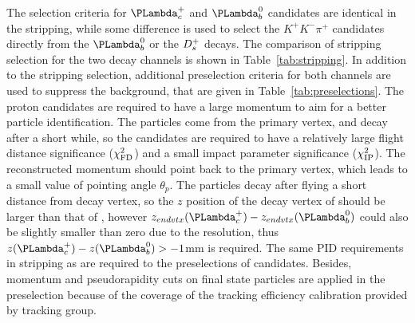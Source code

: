 The selection criteria for $\Lc$ and $\Lb$ candidates are identical in the stripping, 
while some difference is used to select the $K^+K^-\pi^+$ candidates  directly from the $\Lb$ or the ${{D}^+_{s}}$ decays. 
The comparison of stripping selection for the two decay channels is shown in Table~\ref{tab:stripping}. 
In addition to the stripping selection, additional preselection criteria for both channels are used to suppress the background, 
that are given in Table~\ref{tab:preselections}. 
The proton candidates are required to have a large momentum to aim for a better particle identification. 
The \Lb particles come from the primary vertex, 
and decay after a short while, 
so the \Lb candidates are required to have a relatively large flight distance significance ($\chi^2_{\rm FD}$)  
and a small impact parameter significance ($\chi^2_{\rm IP}$). 
The reconstructed \Lb momentum should point back to the primary vertex, 
which leads to a small value of pointing angle $\theta_p$. 
The \Lc particles decay after flying a short distance from \Lb decay vertex, 
so the $z$ position of the decay vertex of \Lc should be larger than that of \Lb, 
however $z_{endvtx}(\Lc) - z_{endvtx}(\Lb)$ could also be slightly smaller than zero due to the resolution, 
thus $z(\Lc)-z(\Lb) > -1$mm is required. 
The same PID requirements in stripping as \LbLckkpi are required to the preselections of \LbLcDs candidates. 
Besides, 
momentum and pseudorapidity cuts on final state particles are applied in the preselection 
because of the coverage of the tracking efficiency calibration provided by tracking group. 


